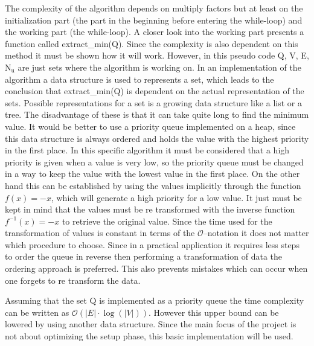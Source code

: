The complexity of the algorithm depends on multiply factors but at least on the initialization part (the part in the beginning before entering the while-loop) and the working part (the while-loop). A closer look into the working part presents a function called extract\_min(Q). Since the complexity is also dependent on this method it must be shown how it will work. However, in this pseudo code  Q, V, E, $\text{N}_\text{u}$ are just sets where the algorithm is working on. In an implementation of the algorithm a data structure is used to represents a set, which leads to the conclusion that extract\_min(Q) is dependent on the actual representation of the sets. Possible representations for a set is a growing data structure like a list or a tree. The disadvantage of these is that it can take quite long to find the minimum value. It would be better to use a priority queue  implemented on a heap, since this data structure is always ordered and holds the value with the highest priority in the first place. In this specific algorithm it must be considered that a high priority is given when a value is very low, so the priority queue must be changed in a way to keep the value with the lowest value in the first place. On the other hand this can be established by using the values implicitly through the function $f(x) = -x$, which will generate a high priority for a low value. It just must be kept in mind that the values must be re transformed with the inverse function $f^{-1}(x) = -x$ to retrieve the original value. Since the time used for the transformation of values is constant in terms of the $\mathcal{O}$--notation it does not matter which procedure to choose. Since in a practical application it requires less steps to order the queue in reverse then performing a transformation of data the ordering approach is preferred. This also prevents mistakes which can occur when one forgets to re transform the data.

Assuming that the set Q is implemented as a priority queue the time complexity can be written as $\mathcal{O}(|E|\cdot\log{(|V|)})$. However this upper bound can be lowered by using another data structure. Since the main focus of the project is not about optimizing the setup phase, this basic implementation will be used.


